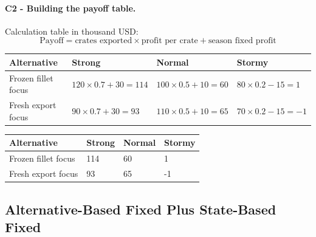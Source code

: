 
	\paragraph*{C2 - Building the payoff table.}
	\label{subsec:problem23-seafood-export-licenses-c2}
	Calculation table in thousand USD:
	\[
	\text{Payoff}=\text{crates exported}\times\text{profit per crate}+\text{season fixed profit}
	\]
	\begin{center}
		\begin{tabular}{llll}
			\toprule
			Alternative & Strong & Normal & Stormy \\
			\midrule
			Frozen fillet focus & $120 \times 0.7 + 30 = 114$ & $100 \times 0.5 + 10 = 60$ & $80 \times 0.2 - 15 = 1$ \\
			Fresh export focus & $90 \times 0.7 + 30 = 93$ & $110 \times 0.5 + 10 = 65$ & $70 \times 0.2 - 15 = -1$ \\
			\bottomrule
		\end{tabular}
	\end{center}

	\begin{center}
		\begin{tabular}{llll}
			\toprule
			Alternative & Strong & Normal & Stormy \\
			\midrule
			Frozen fillet focus & 114 & 60 & 1 \\
			Fresh export focus & 93 & 65 & -1 \\
			\bottomrule
		\end{tabular}
	\end{center}



	\subsection{Alternative-Based Fixed Plus State-Based Fixed}
	\label{sec:alternative-based-fixed-payoff-plus-state-based-fixed-payoff}


